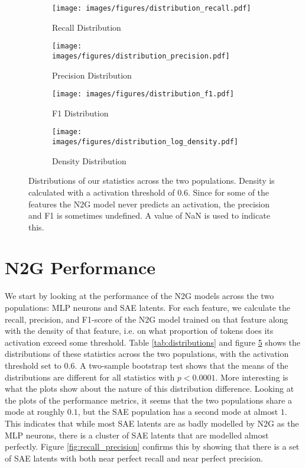 \begin{figure}[h]
    \centering
    
    \begin{subfigure}[b]{0.45\textwidth}
        \centering
        \texttt{[image: images/figures/distribution\_recall.pdf]}
        \caption{Recall Distribution}
        \label{fig:distributions_recall}
    \end{subfigure}
    \begin{subfigure}[b]{0.45\textwidth}
        \centering
        \texttt{[image: images/figures/distribution\_precision.pdf]}
        \caption{Precision Distribution}
        \label{fig:distributions_precision}
    \end{subfigure}
    
    \begin{subfigure}[b]{0.45\textwidth}
        \centering
        \texttt{[image: images/figures/distribution\_f1.pdf]}
        \caption{F1 Distribution}
        \label{fig:distributions_f1}
    \end{subfigure}
    \begin{subfigure}[b]{0.45\textwidth}
        \centering
        \texttt{[image: images/figures/distribution\_log\_density.pdf]}
        \caption{Density Distribution}
        \label{fig:distributions_log_density}
    \end{subfigure}
    
    \caption{Distributions of our statistics across the two populations. 
    Density is calculated with a activation threshold of $0.6$. Since for some of the features the N2G model never predicts an activation, the precision and F1 is sometimes undefined. A value of NaN is used to indicate this.}
    \label{fig:distributions}
\end{figure}

\section{N2G Performance}
We start by looking at the performance of the N2G models across the two populations: MLP neurons and SAE latents.
For each feature, we calculate the recall, precision, and F1-score of the N2G model trained on that feature along with the density of that feature, i.e. on what proportion of tokens does its activation exceed some threshold.
Table \ref{tab:distributions} and figure \ref{fig:distributions} shows the distributions of these statistics across the two populations, with the activation threshold set to $0.6$.
A two-sample bootstrap test shows that the means of the distributions are different for all statistics with $p<0.0001$.
More interesting is what the plots show about the nature of this distribution difference.
Looking at the plots of the performance metrics, it seems that the two populations share a mode at roughly $0.1$, but the SAE population has a second mode at almost $1$.
This indicates that while most SAE latents are as badly modelled by N2G as the MLP neurons, there is a cluster of SAE latents that are modelled almost perfectly.
Figure \ref{fig:recall_precision} confirms this by showing that there is a set of SAE latents with both near perfect recall and near perfect precision.

